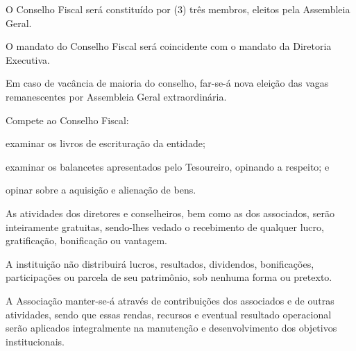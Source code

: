 \documentclass{estatuto}
\begin{document}
\begin{artigos}
			\item O Conselho Fiscal será constituído por (3) três membros, eleitos pela Assembleia Geral.
				\begin{paragrafos}
					\item O mandato do Conselho Fiscal será coincidente com o mandato da Diretoria Executiva.
					\item Em caso de vacância de maioria do conselho, far-se-á nova eleição das vagas remanescentes por Assembleia Geral extraordinária.
				\end{paragrafos}
			\item Compete ao Conselho Fiscal:
				\begin{itens}
					\item examinar os livros de escrituração da entidade;
					\item examinar os balancetes apresentados pelo Tesoureiro, opinando a respeito; e
					\item opinar sobre a aquisição e alienação de bens.
				\end{itens}
			\item As atividades dos diretores e conselheiros, bem como as dos associados, serão inteiramente gratuitas, sendo-lhes vedado o recebimento de qualquer lucro, gratificação, bonificação ou vantagem.
			\item A instituição não distribuirá lucros, resultados, dividendos, bonificações, participações ou parcela de seu patrimônio, sob nenhuma forma ou pretexto.
			\item A Associação manter-se-á através de contribuições dos associados e de outras atividades, sendo que essas rendas, recursos e eventual resultado operacional serão aplicados integralmente na manutenção e desenvolvimento dos objetivos institucionais.

\end{artigos}
\end{document}
